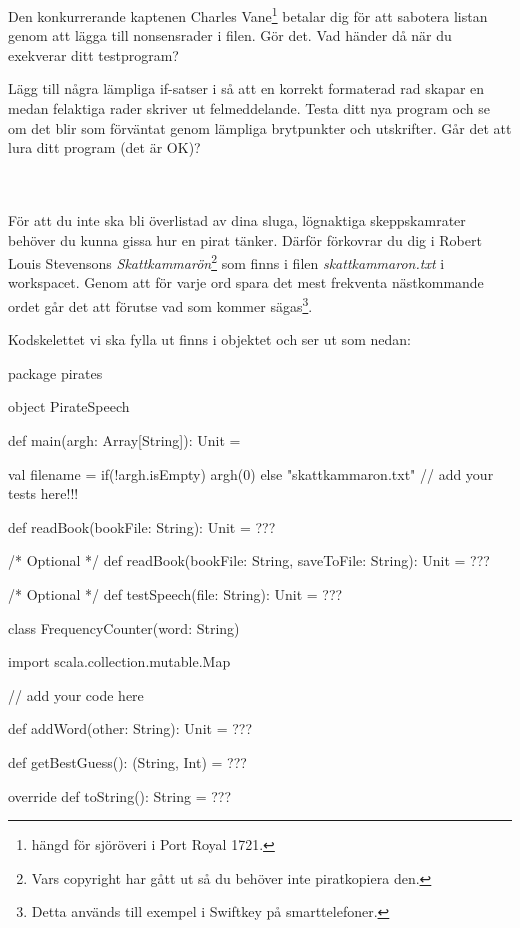 \Subtask Den konkurrerande kaptenen Charles Vane\footnote{hängd för sjöröveri i Port Royal 1721.} betalar dig för att sabotera listan genom att lägga till nonsensrader i filen. Gör det. Vad händer då när du exekverar ditt testprogram?

\Subtask Lägg till några lämpliga if-satser i  så att en korrekt formaterad rad skapar en  medan felaktiga rader skriver ut felmeddelande. 
Testa ditt nya program och se om det blir som förväntat genom lämpliga brytpunkter och utskrifter. Går det att lura ditt program (det är OK)?

\\
\noindent \\
För att du inte ska bli överlistad av dina sluga, lögnaktiga skeppskamrater behöver du kunna gissa hur en pirat tänker. Därför förkovrar du dig i Robert Louis Stevensons \emph{Skattkammarön}\footnote{Vars copyright har gått ut så du behöver inte piratkopiera den.} som finns i filen \emph{skattkammaron.txt} i workspacet.  Genom att för varje ord spara det mest frekventa nästkommande ordet går det att förutse vad som kommer sägas\footnote{Detta används till exempel i Swiftkey på smarttelefoner.}. 

Kodskelettet vi ska fylla ut finns i objektet  och ser ut som nedan:
\begin{CodeSmall}
package pirates

object PirateSpeech {
  	def main(argh: Array[String]): Unit = {
			val filename = if(!argh.isEmpty) argh(0) else "skattkammaron.txt"
			// add your tests here!!!

	}
  	
	def readBook(bookFile: String): Unit = ???
	
  /* Optional */
	def readBook(bookFile: String, saveToFile: String): Unit = ???
  
  
  /* Optional */
	def testSpeech(file: String): Unit = ???
	 
  
  class FrequencyCounter(word: String){
	  
	  import scala.collection.mutable.Map
	  
	  // add your code here
	  
	  def addWord(other: String): Unit = ??? 
 	  
	  def getBestGuess(): (String, Int) =  ???
	  
	  override def toString(): String = ???
	}
}
\end{CodeSmall}

